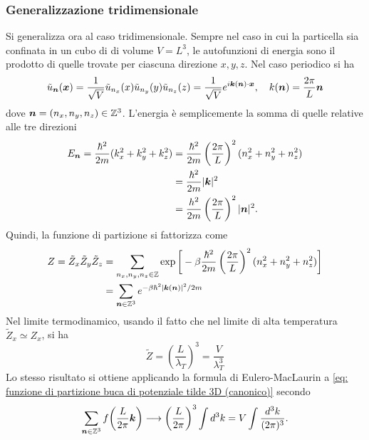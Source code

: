 \subsubsection{Generalizzazione tridimensionale}
Si generalizza ora al caso tridimensionale. Sempre nel caso in cui la particella sia confinata in un cubo di di volume $V = L^3$, le autofunzioni di energia sono il prodotto di quelle trovate per ciascuna direzione $x, y, z$. Nel caso periodico si ha
\begin{equation}
    \tilde{u}_{\bm{n}}(\bm{x}) = \frac{1}{\sqrt{V}} \tilde{u}_{n_x}(x)\tilde{u}_{n_y}(y)\tilde{u}_{n_z}(z) = \frac{1}{\sqrt{V}} e^{i\bm{k}(\bm{n})\cdot \bm{x}},\quad k(\bm{n}) = \frac{2\pi}{L}\bm{n}
\end{equation}
dove $\bm{n} = (n_x, n_y, n_z) \in \mathbb{Z}^3$. L'energia è semplicemente la somma di quelle relative alle tre direzioni
\begin{equation}
    \begin{split}
        E_{\bm{n}} = \frac{\hbar^2}{2m}(k_x^2 + k_y^2 + k_z^2) &= \frac{\hbar^2}{2m}\left(\frac{2\pi}{L}\right)^2 (n_x^2 + n_y^2 + n_z^2) \\
        &= \frac{\hbar^2}{2m}|\bm{k}|^2 \\
        &= \frac{h^2}{2m}\left(\frac{2\pi}{L}\right)^2 |\bm{n}|^2.
    \end{split}
\end{equation}
Quindi, la funzione di partizione si fattorizza come
\begin{equation}
    \label{eq: funzione di partizione buca di potenziale tilde 3D (canonico)}
    \begin{split}
        Z = \tilde{Z}_x \tilde{Z}_y \tilde{Z}_z &= \sum_{n_x,n_y,n_z\in\mathbb{Z}} \exp{\bigg[-\beta \frac{\hbar^2}{2m}\left(\frac{2\pi}{L}\right)^2 (n_x^2+n_y^2+n_z^2)\bigg]} \\
        &= \sum_{\bm{n}\in\mathbb{Z}^3} e^{-\beta\hbar^2 |\bm{k}(\bm{n})|^2/2m}
    \end{split}
\end{equation}
Nel limite termodinamico, usando il fatto che nel limite di alta temperatura $\tilde{Z}_x \simeq Z_x$, si ha
\begin{equation}
    \tilde{Z} = \left(\frac{L}{\lambda_T}\right)^3 = \frac{V}{\lambda_T^3}
\end{equation}
Lo stesso risultato si ottiene applicando la formula di Eulero-MacLaurin a \eqref{eq: funzione di partizione buca di potenziale tilde 3D (canonico)} secondo
\begin{equation}
    \sum_{\bm{n}\in\mathbb{Z}^3} f\bigg(\frac{L}{2\pi}\bm{k}\bigg)
    \longrightarrow \left(\frac{L}{2\pi}\right)^3 \int d^3k
    = V \int \frac{d^3k}{(2\pi)^3}.
\end{equation}
